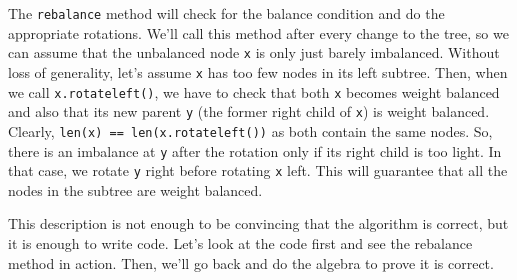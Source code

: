 The \texttt{rebalance} method will check for the balance condition and do the appropriate rotations.
We'll call this method after every change to the tree, so we can assume that the unbalanced node \texttt{x} is only just barely imbalanced.
Without loss of generality, let's assume \texttt{x} has too few nodes in its left subtree.
Then, when we call \texttt{x.rotateleft()}, we have to check that both \texttt{x} becomes weight balanced and also that its new parent \texttt{y} (the former right child of \texttt{x}) is weight balanced.
Clearly, \texttt{len(x) == len(x.rotateleft())} as both contain the same nodes.
So, there is an imbalance at \texttt{y} after the rotation only if its right child is too light.
In that case, we rotate \texttt{y} right before rotating \texttt{x} left.
This will guarantee that all the nodes in the subtree are weight balanced.


This description is not enough to be convincing that the algorithm is correct, but it is enough to write code.
Let's look at the code first and see the rebalance method in action.
Then, we'll go back and do the algebra to prove it is correct.

